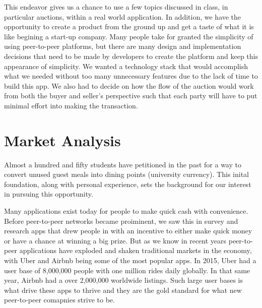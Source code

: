 \documentclass[column,12pt]{article}
\begin{document}
This endeavor gives us a chance to use a few topics discussed in class, in particular auctions, within a real world application. In addition, we have the opportunity to create a product from the ground up and get a taste of what it is like begining a start-up company. Many people take for granted the simplicity of using peer-to-peer platforms, but there are many design and implementation decisions that need to be made by developers to create the platform and keep this
appearance of simplicity. We wanted a technology stack that would accomplish what we needed without too many unnecessary features due to the lack of time to build this app. We also had to decide on how the flow of the auction would work from both the buyer and seller's perspective such that each party will have to put minimal effort into making the transaction. 


\section{Market Analysis}


Almost a hundred and fifty students have petitioned in the past for a way to convert unused guest meals into dining points (university currency). This inital foundation, along with personal experience, sets the background for our interest in pursuing this opportunity. 

Many applications exist today for people to make quick cash with convenience. Before peer-to-peer networks became proiminent, we saw this in survey and research apps that drew people in with an incentive to either make quick money or have a chance at winning a big prize. But as we know in recent years peer-to-peer applications have exploded and shaken traditional markets in the economy, with Uber and Airbnb being some of the most popular apps. In 2015, Uber had a user base of 8,000,000 people with one million rides daily globally. In that same year, Airbnb had a over 2,000,000 worldwide listings. Such large user bases is what drive these apps to thrive and they are the gold standard for what new peer-to-peer comapnies strive to be. 
\end{document}
